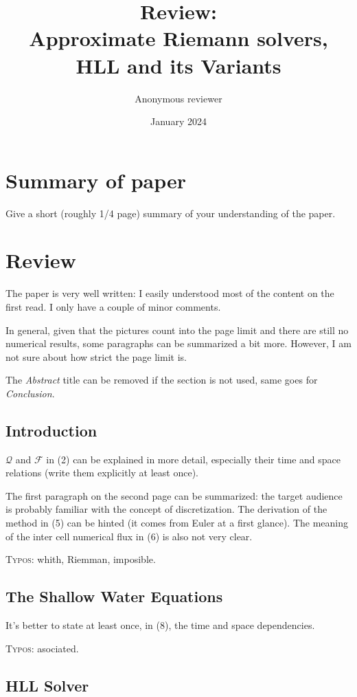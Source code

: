 \documentclass{scrartcl}
\title{Review: \\Approximate Riemann solvers, HLL and its Variants}
\author{Anonymous reviewer} %
\date{January 2024}
\begin{document}
\maketitle

\section{Summary of paper}
Give a short (roughly 1/4 page) summary of your understanding of the paper.

\section{Review}

The paper is very well written: I easily understood most of the content on the first read. I only have a couple of minor comments.

In general, given that the pictures count into the page limit and there are still no numerical results, some paragraphs can be summarized a bit more. However, I am not sure about how strict the page limit is.

The \textit{Abstract} title can be removed if the section is not used, same goes for \textit{Conclusion}.

\subsection{Introduction}

$\mathcal{Q}$ and $\mathcal{F}$ in (2) can be explained in more detail, especially their time and space relations (write them explicitly at least once).

The first paragraph on the second page can be summarized: the target audience is probably familiar with the concept of discretization. The derivation of the method in (5) can be hinted (it comes from Euler at a first glance). The meaning of the inter cell numerical flux in (6) is also not very clear.

\textsc{Typos}: whith, Riemman, imposible.

\subsection{The Shallow Water Equations}

It's better to state at least once, in (8), the time and space dependencies.

\textsc{Typos}: asociated.

\subsection{HLL Solver}
\end{document}
